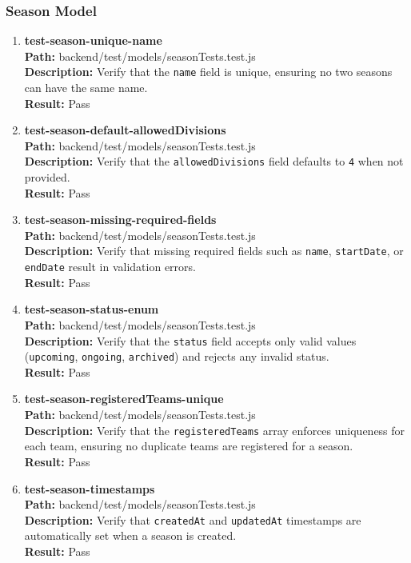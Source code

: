 \documentclass[12pt, titlepage]{article}
\begin{document}
\subsubsection{Season Model}
\begin{enumerate}
    \item{\textbf{test-season-unique-name}\\}
    \textbf{Path:} backend/test/models/seasonTests.test.js\\
    \textbf{Description:} Verify that the \texttt{name} field is unique, ensuring no two seasons can have the same name.\\
    \textbf{Result:} Pass

    \item{\textbf{test-season-default-allowedDivisions}\\}
        \textbf{Path:} backend/test/models/seasonTests.test.js\\
        \textbf{Description:} Verify that the \texttt{allowedDivisions} field defaults to \texttt{4} when not provided.\\
        \textbf{Result:} Pass

    \item{\textbf{test-season-missing-required-fields}\\}
        \textbf{Path:} backend/test/models/seasonTests.test.js\\
        \textbf{Description:} Verify that missing required fields such as \texttt{name}, \texttt{startDate}, or \texttt{endDate} result in validation errors.\\
        \textbf{Result:} Pass

    \item{\textbf{test-season-status-enum}\\}
        \textbf{Path:} backend/test/models/seasonTests.test.js\\
        \textbf{Description:} Verify that the \texttt{status} field accepts only valid values (\texttt{upcoming}, \texttt{ongoing}, \texttt{archived}) and rejects any invalid status.\\
        \textbf{Result:} Pass

    \item{\textbf{test-season-registeredTeams-unique}\\}
        \textbf{Path:} backend/test/models/seasonTests.test.js\\
        \textbf{Description:} Verify that the \texttt{registeredTeams} array enforces uniqueness for each team, ensuring no duplicate teams are registered for a season.\\
        \textbf{Result:} Pass

    \item{\textbf{test-season-timestamps}\\}
        \textbf{Path:} backend/test/models/seasonTests.test.js\\
        \textbf{Description:} Verify that \texttt{createdAt} and \texttt{updatedAt} timestamps are automatically set when a season is created.\\
        \textbf{Result:} Pass

\end{enumerate}
\end{document}
